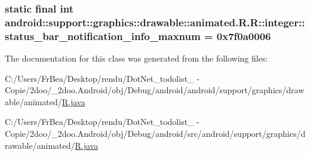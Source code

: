 \hypertarget{classandroid_1_1support_1_1graphics_1_1drawable_1_1animated_1_1_r_1_1integer_0356c9744c8c485c0cacfca0435e34cc}{
\subsubsection[{status\_\-bar\_\-notification\_\-info\_\-maxnum}]{\setlength{\rightskip}{0pt plus 5cm}static final int android::support::graphics::drawable::animated.R.R::integer::status\_\-bar\_\-notification\_\-info\_\-maxnum = 0x7f0a0006}}
\label{classandroid_1_1support_1_1graphics_1_1drawable_1_1animated_1_1_r_1_1integer_0356c9744c8c485c0cacfca0435e34cc}




The documentation for this class was generated from the following files:\begin{CompactItemize}
\item 
C:/Users/FrBea/Desktop/rendu/DotNet\_\-todolist\_ - Copie/2doo/\_\-2doo.Android/obj/Debug/android/android/support/graphics/drawable/animated/\hyperlink{android_2support_2graphics_2drawable_2animated_2_r_8java}{R.java}\item 
C:/Users/FrBea/Desktop/rendu/DotNet\_\-todolist\_ - Copie/2doo/\_\-2doo.Android/obj/Debug/android/src/android/support/graphics/drawable/animated/\hyperlink{src_2android_2support_2graphics_2drawable_2animated_2_r_8java}{R.java}\end{CompactItemize}
